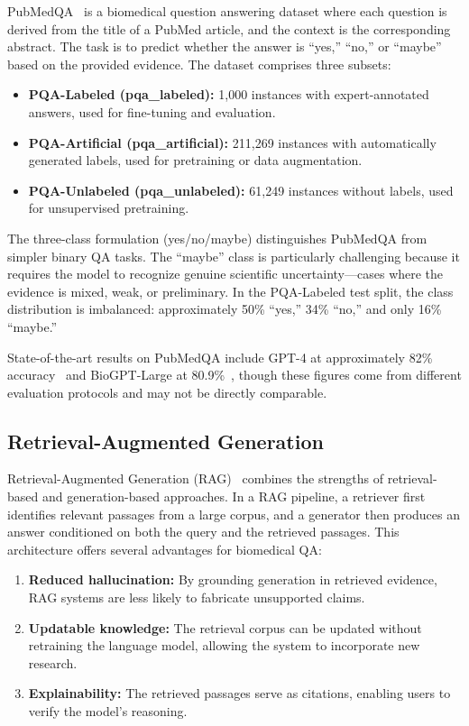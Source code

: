 \documentclass[conference]{IEEEtran}
\begin{document}
PubMedQA~\cite{jin2019pubmedqa} is a biomedical question answering dataset where each question is derived from the title of a PubMed article, and the context is the corresponding abstract. The task is to predict whether the answer is ``yes,'' ``no,'' or ``maybe'' based on the provided evidence. The dataset comprises three subsets:

\begin{itemize}[leftmargin=*]
    \item \textbf{PQA-Labeled (pqa\_labeled):} 1,000 instances with expert-annotated answers, used for fine-tuning and evaluation.
    \item \textbf{PQA-Artificial (pqa\_artificial):} 211,269 instances with automatically generated labels, used for pretraining or data augmentation.
    \item \textbf{PQA-Unlabeled (pqa\_unlabeled):} 61,249 instances without labels, used for unsupervised pretraining.
\end{itemize}

The three-class formulation (yes/no/maybe) distinguishes PubMedQA from simpler binary QA tasks. The ``maybe'' class is particularly challenging because it requires the model to recognize genuine scientific uncertainty---cases where the evidence is mixed, weak, or preliminary. In the PQA-Labeled test split, the class distribution is imbalanced: approximately 50\% ``yes,'' 34\% ``no,'' and only 16\% ``maybe.''

State-of-the-art results on PubMedQA include GPT-4 at approximately 82\% accuracy~\cite{openai2023gpt4} and BioGPT-Large at 80.9\%~\cite{luo2022biogpt}, though these figures come from different evaluation protocols and may not be directly comparable.

\subsection{Retrieval-Augmented Generation}

Retrieval-Augmented Generation (RAG)~\cite{lewis2020retrieval} combines the strengths of retrieval-based and generation-based approaches. In a RAG pipeline, a retriever first identifies relevant passages from a large corpus, and a generator then produces an answer conditioned on both the query and the retrieved passages. This architecture offers several advantages for biomedical QA:

\begin{enumerate}[leftmargin=*]
    \item \textbf{Reduced hallucination:} By grounding generation in retrieved evidence, RAG systems are less likely to fabricate unsupported claims.
    \item \textbf{Updatable knowledge:} The retrieval corpus can be updated without retraining the language model, allowing the system to incorporate new research.
    \item \textbf{Explainability:} The retrieved passages serve as citations, enabling users to verify the model's reasoning.
\end{enumerate}
\end{document}
